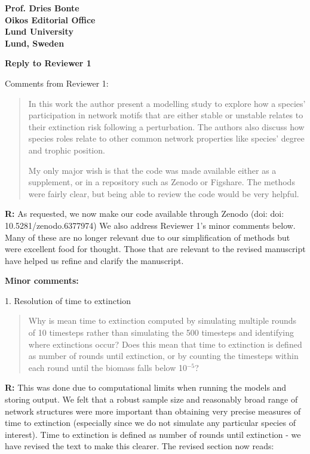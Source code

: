 \documentclass[12pt]{letter}
\begin{document}
\begin{letter}{\bf Prof. Dries Bonte\\
Oikos Editorial Office \\
Lund University \\
Lund, Sweden}
\clearpage

{\large\textbf{Reply to Reviewer 1}} 

Comments from Reviewer 1:
    \begin{quotation}
      In this work the author present a modelling study to explore how a species' participation in network motifs that are either stable or unstable relates to their extinction risk following a perturbation. The authors also discuss how species roles relate to other common network properties like species' degree and trophic position. 
    
      My only major wish is that the code was made available either as a supplement, or in a repository such as Zenodo or Figshare. The methods were fairly clear, but being able to review the code would be very helpful.

    \end{quotation}

\textbf{R:} As requested, we now make our code available through Zenodo (doi: doi: 10.5281/zenodo.6377974) We also address Reviewer 1's minor comments below. Many of these are no longer relevant due to our simplification of methods but were excellent food for thought. Those that are relevant to the revised manuscript have helped us refine and clarify the manuscript.



  \textbf{Minor comments:}

  1. Resolution of time to extinction

    \begin{quotation}
    Why is mean time to extinction computed by simulating multiple rounds of 10 timesteps rather than simulating the 500 timesteps and identifying where extinctions occur? Does this mean that time to extinction is defined as number of rounds until extinction, or by counting the timesteps within each round until the biomass falls below 10$^{-5}$? 
    \end{quotation}

    \textbf{R:} This was done due to computational limits when running the models and storing output. We felt that a robust sample size and reasonably broad range of network structures were more important than obtaining very precise measures of time to extinction (especially since we do not simulate any particular species of interest). Time to extinction is defined as number of rounds until extinction - we have revised the text to make this clearer. The revised section now reads:


\end{letter}
\end{document}
